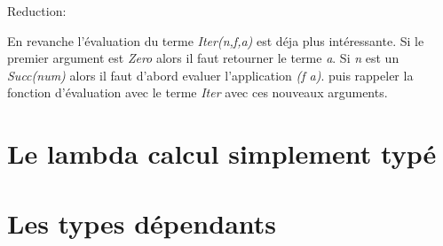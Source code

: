 \documentclass {article}
\newcommand{\codefrom}[3]
           {}
\theoremstyle{definition}
\theoremstyle{remark}
\begin{document}
\codefrom{untyped}{lambda}{nat_substitution}

Reduction:

\codefrom{untyped}{lambda}{nat_reduction}

En revanche l'évaluation du terme \emph{Iter(n,f,a)} est déja plus intéressante.
Si le premier argument est \emph{Zero} alors il faut retourner le terme \emph{a}.
Si \emph{n} est un \emph{Succ(num)} alors il faut d'abord evaluer l'application 
\emph{(f a)}. puis rappeler la fonction d'évaluation avec le terme 
\emph{Iter} avec ces nouveaux arguments.

\codefrom{untyped}{lambda}{nat_evaluation}

\section{Le lambda calcul simplement typé}

\section{Les types dépendants}







\end{document}

